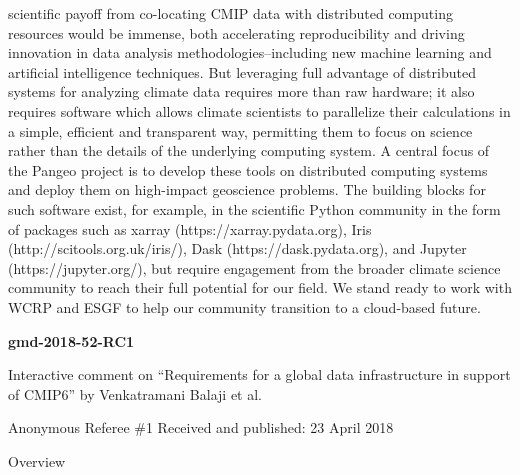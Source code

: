 \documentclass[gmd,manuscript]{copernicus}
\begin{document}
\begin{enumerate}[label=SC1-\arabic*,leftmargin=*]
  scientific payoff from co-locating CMIP data with distributed
  computing resources would be immense, both accelerating
  reproducibility and driving innovation in data analysis
  methodologies–including new machine learning and artificial
  intelligence techniques. But leveraging full advantage of
  distributed systems for analyzing climate data requires more than
  raw hardware; it also requires software which allows climate
  scientists to parallelize their calculations in a simple, efficient
  and transparent way, permitting them to focus on science rather than
  the details of the underlying computing system. A central focus of
  the Pangeo project is to develop these tools on distributed
  computing systems and deploy them on high-impact geoscience
  problems. The building blocks for such software exist, for example,
  in the scientific Python community in the form of packages such as
  xarray (https://xarray.pydata.org), Iris
  (http://scitools.org.uk/iris/), Dask (https://dask.pydata.org), and
  Jupyter (https://jupyter.org/), but require engagement from the
  broader climate science community to reach their full potential for
  our field. We stand ready to work with WCRP and ESGF to help our
  community transition to a cloud-based future.
\end{enumerate}
\pagebreak


\textbf{gmd-2018-52-RC1}

Interactive comment on “Requirements for a global data infrastructure
in support of CMIP6” by Venkatramani Balaji et al.

Anonymous Referee \#1
Received and published: 23 April 2018

Overview
\end{document}
